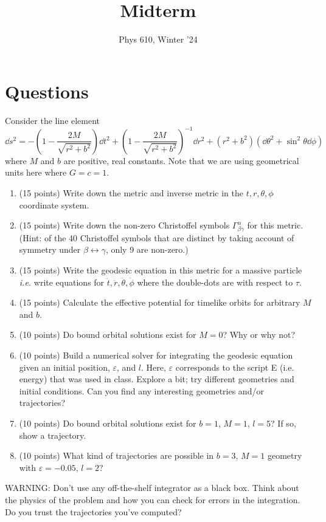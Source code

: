 \documentclass[12pt]{article}
\newcommand{\chrissym}[3]{\Gamma_{#2#3}^#1}
\begin{document}
\title{Midterm}
\author{Phys 610, Winter '24}
\maketitle

\section*{Questions}
Consider the line element
\[ \dd s^2 = -\left(1 - \frac{2M}{\sqrt{r^2 + b^2}}\right)\dd t^2 + \left(1 - \frac{2M}{\sqrt{r^2 + b^2}}\right)^{-1}\dd r^2 + (r^2 + b^2)(\dd\theta^2 + \sin^2\theta\dd\phi) \]
where $M$ and $b$ are positive, real constants. Note that we are using geometrical units here where $G = c = 1$.
\begin{enumerate}
    \item (15 points) Write down the metric and inverse metric in the $t, r, \theta, \phi$ coordinate system.

    \item (15 points) Write down the non-zero Christoffel symbols $\chrissym{\alpha}{\beta}{\gamma}$ for this metric. (Hint: of the 40 Christoffel symbols that are distinct by taking account of symmetry under $\beta \leftrightarrow \gamma$, only 9 are non-zero.)

    \item (15 points) Write the geodesic equation in this metric for a massive particle \textit{i.e.} write equations for $\ddot{t}, \ddot{r}, \ddot{\theta}, \ddot{\phi}$ where the double-dots are with respect to $\tau$.

    \item (15 points) Calculate the effective potential for timelike orbits for arbitrary $M$ and $b$.

    \item (10 points) Do bound orbital solutions exist for $M = 0$? Why or why not?
    
    \item (10 points) Build a numerical solver for integrating the geodesic equation given an initial position, $\varepsilon$, and $l$. Here, $\varepsilon$ corresponds to the script E (i.e. energy) that was used in class. Explore a bit; try different geometries and initial conditions. Can you find any interesting geometries and/or trajectories?
    
    \item (10 points) Do bound orbital solutions exist for $b=1$, $M=1$, $l=5$? If so, show a trajectory.
    
    \item (10 points) What kind of trajectories are possible in $b=3$, $M=1$ geometry with $\varepsilon=-0.05$, $l=2$?
\end{enumerate}
WARNING: Don't use any off-the-shelf integrator as a black box.  Think about the physics of the problem and how you can check for errors in the integration.  Do you trust the trajectories you've computed?
\end{document}
